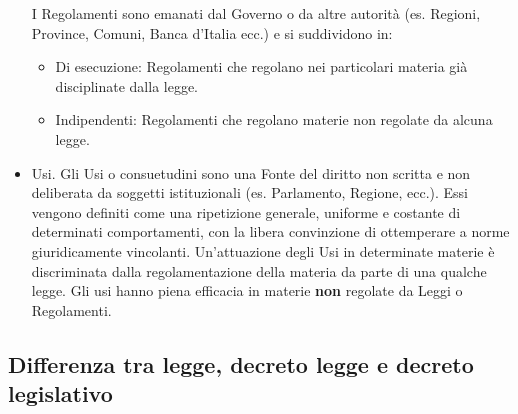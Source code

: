 \begin{itemize}
        I Regolamenti sono emanati dal Governo o da altre autorità (es. Regioni, Province, Comuni, Banca d'Italia ecc.) e
        si suddividono in:
        \begin{itemize}
            \item Di esecuzione: Regolamenti che regolano nei particolari materia già disciplinate dalla
                legge.
            \item Indipendenti: Regolamenti che regolano materie non regolate da alcuna legge.
        \end{itemize}
    \item Usi. \newline
        Gli Usi o consuetudini sono una Fonte del diritto non scritta e non deliberata da soggetti 
        istituzionali (es. Parlamento, Regione, ecc.). Essi vengono definiti come una ripetizione
        generale, uniforme e costante di determinati comportamenti, con la libera convinzione di ottemperare
        a norme giuridicamente vincolanti.\newline
        Un'attuazione degli Usi in determinate materie è discriminata dalla regolamentazione della materia da parte 
        di una qualche legge. Gli usi hanno piena efficacia in materie \textbf{non} regolate da Leggi o Regolamenti.
\end{itemize}

\subsection{Differenza tra legge, decreto legge e decreto legislativo}


